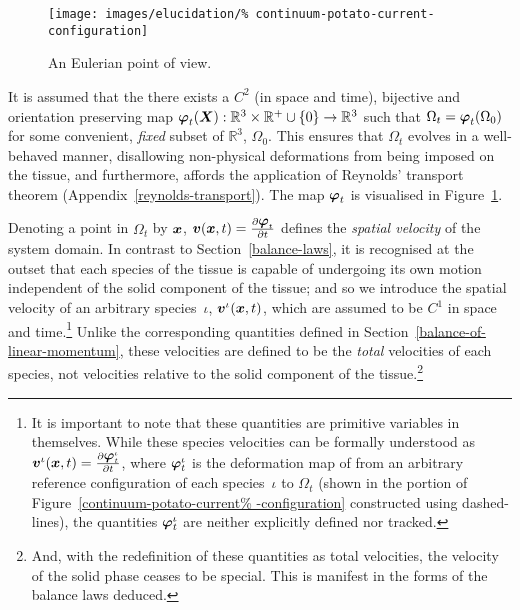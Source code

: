 \begin{figure}
  \centering
  \texttt{[image: images/elucidation/\%
    continuum-potato-current-configuration]}
  \caption{An Eulerian point of view.}
  \label{continuum-potato-current-configuration}
\end{figure}

It is assumed that the there exists a {$\mathit{C}^{2}$} (in space and
time), bijective and orientation preserving map $\mbox{\boldmath$\varphi$}_{t}(\mbox{\boldmath$ X$}):
\mathbb{R}^3\times\mathbb{R}^{+}\cup\{0\} \rightarrow\mathbb{R}^{3}$
such that $\Omega_{t} = \mbox{\boldmath$\varphi$}_{t} (\Omega_{0})$ for some
convenient, {\em fixed} subset of $\mathbb{R}^{3}$, $\Omega_{0}$. This
ensures that $\Omega_{t}$ evolves in a well-behaved manner,
disallowing non-physical deformations from being imposed on the
tissue, and furthermore, affords the application of Reynolds'
transport theorem (Appendix~\ref{reynolds-transport}). The map
$\mbox{\boldmath$\varphi$}_{t}$ is visualised in
Figure~\ref{continuum-potato-current-configuration}.

Denoting a point in $\Omega_{t}$ by $\mbox{\boldmath$ x$}$, $\mbox{\boldmath$ v$}(\mbox{\boldmath$ x$},t) =
\frac{\partial \mbox{\boldmath$\varphi$}_{t}}{\partial t}$ defines the {\em spatial
  velocity} of the system domain. In contrast to
Section~\ref{balance-laws}, it is recognised at the outset that each
species of the tissue is capable of undergoing its own motion
independent of the solid component of the tissue; and so we introduce
the spatial velocity of an arbitrary species~$\iota$,
$\mbox{\boldmath$ v$}^{\iota}(\mbox{\boldmath$ x$},t)$, which are assumed to be $\mathit{C}^{1}$ in
space and time.\footnote{It is important to note that these quantities
  are primitive variables in themselves. While these species
  velocities can be formally understood as \mbox{$\mbox{\boldmath$ v$}^{\iota}(\mbox{\boldmath$ x$},t) =
    \frac{\partial \mbox{\boldmath$\varphi$}^{\iota}_{t}}{\partial t}$}, where
  $\mbox{\boldmath$\varphi$}^{\iota}_{t}$ is the deformation map of from an arbitrary
  reference configuration of each species~$\iota$ to $\Omega_{t}$
  (shown in the portion of Figure~\ref{continuum-potato-current%
    -configuration} constructed using dashed-lines), the quantities
  $\mbox{\boldmath$\varphi$}^{\iota}_{t}$ are neither explicitly defined nor tracked.}
Unlike the corresponding quantities defined in
Section~\ref{balance-of-linear-momentum}, these velocities are defined
to be the {\em total} velocities of each species, not velocities
relative to the solid component of the tissue.\footnote{And, with the
  redefinition of these quantities as total velocities, the velocity
  of the solid phase ceases to be special. This is manifest in the
  forms of the balance laws deduced.}

